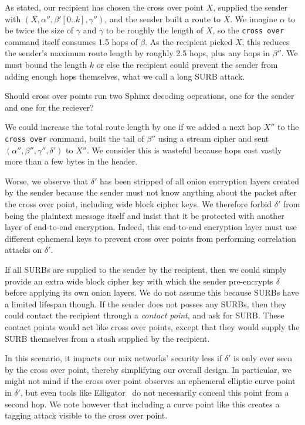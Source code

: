 As stated, our recipient has chosen the cross over point $X$,
supplied the sender with $(X,\alpha'',\beta'[0..k],\gamma'')$,
and the sender built a route to $X$.  We imagine $\alpha$ to be
twice the size of $\gamma$ and $\gamma$ to be roughly the length of
$X$, so the {\tt cross over} command itself consumes 1.5 hops of $\beta$.
As the recipient picked $X$, this reduces the sender's maximum route
length by roughly 2.5 hops, plus any hops in $\beta''$.
We must bound the length $k$ or else the recipient could prevent
the sender from adding enough hops themselves, what we call a
long SURB attack.

\begin{issue}
Should cross over points run two Sphinx decoding oeprations,
one for the sender and one for the reciever?
\end{issue}

We could increase the total route length by one if we added a next
hop $X''$ to the {\tt cross over} command, built the tail of $\beta''$
using a stream cipher and sent $(\alpha'',\beta'',\gamma'',\delta')$
to $X''$. We consider this is wasteful because hops cost vastly more
than a few bytes in the header.

Worse, we observe that $\delta'$ has been stripped of all onion
encryption layers created by the sender because the sender must not
know anything about the packet after the cross over point,
 including wide block cipher keys.
We therefore forbid $\delta'$ from being the plaintext message itself
and insist that it be protected with another layer of end-to-end
encryption.  Indeed, this end-to-end encryption layer must use
different ephemeral keys to prevent cross over points from performing
correlation attacks on $\delta'$.

If all SURBs are supplied to the sender by the recipient, then
we could simply provide an extra wide block cipher key with which
the sender pre-encrypts $\delta$ before applying its own onion layers.
We do not assume this because SURBs have a limited lifespan though.  
If the sender does not posses any SURBs, then they could contact the
recipient through a {\em contact point}, and ask for SURB. 
These contact points would act like cross over points, except
that they would supply the SURB themselves from a stash supplied by
the recipient.

In this scenario, it impacts our mix networks' security less if
$\delta'$ is only ever seen by the cross over point, thereby
simplifying our overall design.   In particular, we might not mind
if the cross over point observes an ephemeral elliptic curve point
in $\delta'$, but even tools like Elligator~\cite{elligator} do not
necessarily conceal this point from a second hop.  We note however
that including a curve point like this creates a tagging attack
visible to the cross over point.

